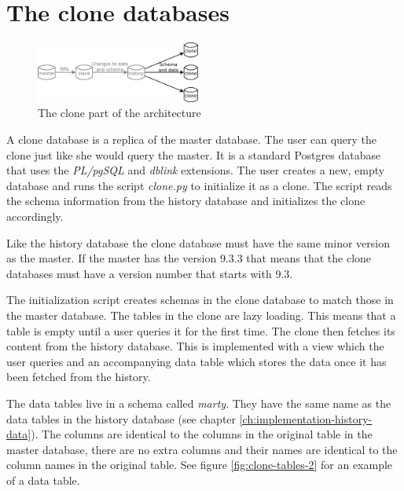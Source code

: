 \section{The clone databases}
\label{ch:impementation-clones}

\begin{figure}
  \vspace{-20pt}
  \begin{center}
    \includegraphics[width=0.48\textwidth]{img/architecture-clones}
  \end{center}
  \vspace{-20pt}
  \caption{The clone part of the architecture}
  \vspace{-10pt}
\end{figure}

A clone database is a replica of the master database.
The user can query the clone just like she would query the master.
It is a standard Postgres database that uses the \textit{PL/pgSQL} and \textit{dblink} extensions.
The user creates a new, empty database and runs the script \textit{clone.py} to initialize it as a clone.
The script reads the schema information from the history database and initializes the clone accordingly.

Like the history database the clone database must have the same minor version as the master.
If the master has the version 9.3.3 that means that the clone databases must have a version number that starts with 9.3.

The initialization script creates schemas in the clone database to match those in the master database.
The tables in the clone are lazy loading.
This means that a table is empty until a user queries it for the first time.
The clone then fetches its content from the history database.
This is implemented with a view which the user queries and an accompanying data table which stores the data once it has been fetched from the history.

The data tables live in a schema called \textit{marty}.
They have the same name as the data tables in the history database (see chapter \ref{ch:implementation-history-data}).
The columns are identical to the columns in the original table in the master database, there are no extra columns and their names are identical to the column names in the original table.
See figure \ref{fig:clone-tables-2} for an example of a data table.

